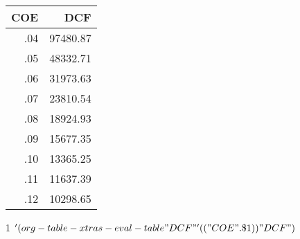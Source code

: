 \documentclass[11pt]{article}
\begin{document}
\begin{table}
\centering
\begin{threeparttable}

\begin{tabular}{rr}
COE & DCF\tnote{1}\\
\hline
.04 & 97480.87\\
.05 & 48332.71\\
.06 & 31973.63\\
.07 & 23810.54\\
.08 & 18924.93\\
.09 & 15677.35\\
.10 & 13365.25\\
.11 & 11637.39\\
.12 & 10298.65\\
\end{tabular}

\begin{tablenotes}
\item [1] \('(org-table-xtras-eval-table "DCF" '(("COE" . \$1)) "DCF")\)
\end{tablenotes}

\end{threeparttable}
\end{table}
\end{document}
